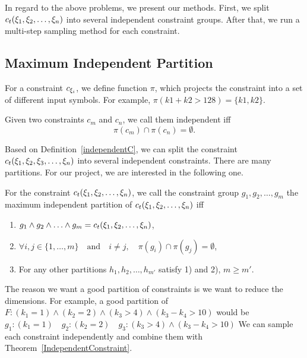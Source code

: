 In regard to the above problems, we present our methods. First, we split
$c_t({\xi}_{1},{\xi}_{2},\ldots,{\xi}_{n})$ into several independent constraint
groups. After that, we run a multi-step sampling method for each constraint.

\subsection{Maximum Independent Partition}

For a constraint $c_{{\xi}_{i}}$, we define function $\pi$, which projects the
constraint into a set of different input symbols. For example, $\pi(k1 + k2 >
    128) = \{k1, k2\}$.

\begin{mydef}[]
    \label{independentC}
    Given two constraints $c_m$ and $c_n$, we call them independent iff
    $$\pi(c_m) \cap \pi(c_n) = \emptyset.$$
\end{mydef}

Based on Definition~\ref{independentC}, we can split the constraint
$c_t({\xi}_{1},{\xi}_{2},{\xi}_{3},\ldots,{\xi}_{n})$ into several independent constraints.
There are many partitions. For our project, we are interested in the following
one.

\begin{mydef}\label{Goodpartition}
    For the constraint $c_t({\xi}_{1},{\xi}_{2},\ldots,{\xi}_{n})$,
    we call the constraint group
    $g_{1}, g_{2}, \ldots, g_{m}$
    the maximum independent partition of $c_t({\xi}_{1},{\xi}_{2},\ldots,{\xi}_{n})$ iff
    \begin{enumerate}
        \item $g_{1} \land g_{2} \land \ldots \land g_{m} = c_t({\xi}_{1},{\xi}_{2},\ldots,{\xi}_{n})$,
        \item $\forall i, j \in \{1, \ldots, m\} \quad \textrm{and} \quad
                  i \neq j,\quad\pi(g_{i}) \cap \pi(g_{j}) = \emptyset $,
        \item For any other partitions  $h_{1}, h_{2}, \ldots, h_{m'}$ satisfy 1) and
              2), $m \geq m'$.
    \end{enumerate}

\end{mydef}

The reason we want a good partition of constraints is we want to reduce
the dimensions. For example,
a good partition of $F: ({k_1} = 1)\land({k_2} = 2)\land({k_3} > 4)\land({k_3} - {k_4} > 10)$ would be
$g_{1}: ({k_1} = 1)\quad g_{2}: ({k_2} = 2)\quad g_{3}: ({k_3} > 4) \land
    ({k_3} - {k_4} > 10)$
We can sample each constraint independently and combine them
with Theorem~\ref{IndependentConstraint}.

